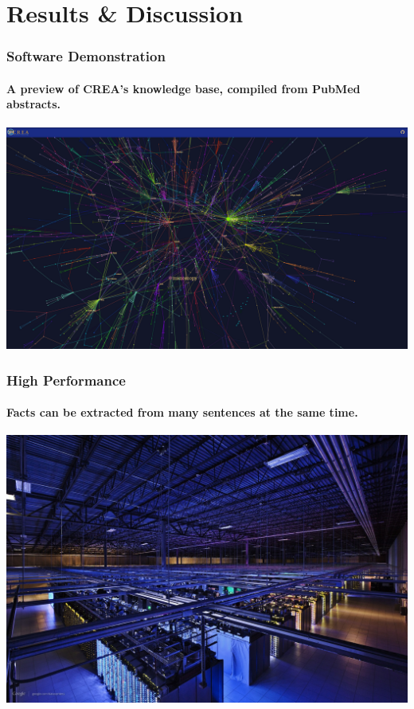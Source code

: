 \documentclass[mathserif]{beamer}
\begin{document}
\section{Results \& Discussion}

\begin{frame}

\frametitle{Software Demonstration}
\framesubtitle{A preview of CREA's knowledge base, compiled from
PubMed abstracts.}

\href{http://markfarrell.ca/creal}{\includegraphics[width=1.0\linewidth]{images/results.png}}

\end{frame}

\begin{frame}

\frametitle{High Performance}
\framesubtitle{Facts can be extracted from many sentences at the same time.}

\includegraphics[width=1.0\linewidth]{images/parallel.jpg}

\end{frame}
\end{document}
